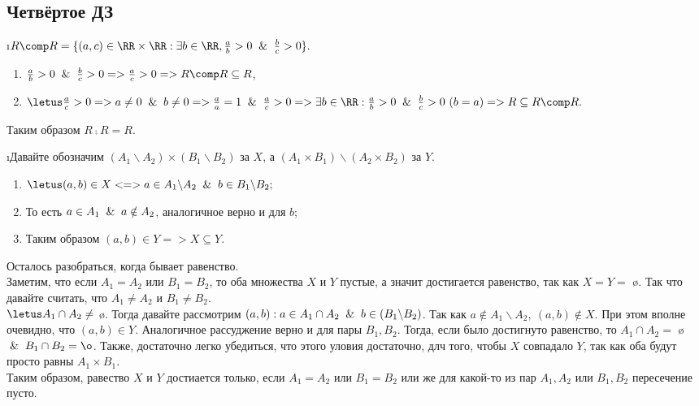 \subsection{Четвёртое ДЗ}


\i $R \comp R = \{(a, c) \in \RR \times \RR: \exists b \in \RR, \frac{a}{b} > 0 \And \frac{b}{c} > 0\}.$ 
\begin{enumerate}
    \item $\frac{a}{b} > 0 \And \frac{b}{c} > 0 => \frac{a}{c} > 0 => R \comp R \subseteq R$,
    \item $\letus \frac{a}{c} > 0 => a \ne 0 \And b \ne 0 => \frac{a}{a} = 1 \And \frac{a}{c} > 0 => \exists b \in \RR: \frac{a}{b} > 0 \And \frac{b}{c} > 0 \ (b = a) => R \subseteq R \comp R.$
\end{enumerate}
Таким образом $R \comp R = R$.

\i Давайте обозначим $(A_1 \backslash A_2) \times (B_1 \backslash B_2)$ за $X$, а $(A_1 \times B_1) \backslash (A_2 \times B_2)$ за $Y$.
\begin{enumerate}
    \item $\letus (a, b) \in X <=> a \in A_1 \backslash A_2 \And b \in B_1 \backslash B_2;$
    \item То есть $a \in A_1 \And a \notin A_2$, аналогичное верно и для $b$;
    \item Таким образом $(a, b) \in Y => X \subseteq Y$.
\end{enumerate}
Осталось разобраться, когда бывает равенство.\\
Заметим, что если $A_1 = A_2$ или $B_1 = B_2$, то оба множества $X$ и $Y$ пустые, а значит достигается равенство, так как $X = Y =$ \o. Так что давайте считать, что $A_1 \ne A_2$ и $B_1 \ne B_2$.\\
$\letus A_1 \cap A_2 \ne$ \o. Тогда давайте рассмотрим $(a, b): a \in A_1 \cap A_2 \And b \in (B_1 \backslash B_2)$. Так как $a \notin A_1 \backslash A_2, \ (a, b) \notin X$. При этом вполне очевидно, что $(a, b) \in Y$. Аналогичное рассуджение верно и для пары $B_1, B_2$. Тогда, если было достигнуто равенство, то $A_1 \cap A_2 =$ \o $\And B_1 \cap B_2 = \o$. Также, достаточно легко убедиться, что этого уловия достаточно, длч того, чтобы $X$ совпадало $Y$, так как оба будут просто равны $A_1 \times B_1$.\\
Таким образом, равество $X$ и $Y$ достиается только, если $A_1 = A_2$ или $B_1 = B_2$ или же для какой-то из пар $A_1, A_2$ или $B_1, B_2$ пересечение пусто.

